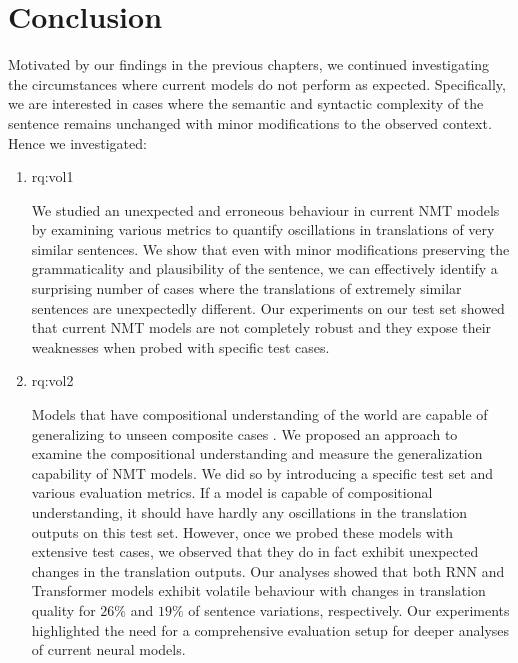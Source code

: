 \section{Conclusion} \label{secvolconc}

Motivated by our findings in the previous chapters, we continued investigating the circumstances where current models do not perform as expected. 
Specifically, we are interested in cases where the semantic and syntactic complexity of the sentence remains unchanged with minor modifications to the observed context. 
Hence we investigated:


 
\begin{enumerate}[label=\textbf{RQ3.\arabic* },wide = 0pt, leftmargin=2em]
\setlength\itemsep{1em}
 \setcounter{enumi}{2}
\item \acl{rq:vol1}

\medskip

\noindent We studied an unexpected and erroneous behaviour in current NMT models by examining various metrics to quantify oscillations in translations of very similar sentences.   
We show that even with minor modifications preserving the grammaticality and plausibility of the sentence, we can effectively identify a surprising number of cases where the translations of extremely similar sentences are unexpectedly different. 
Our experiments on our test set showed that current NMT models are not completely robust and they expose their weaknesses when probed with specific test cases.

\item \acl{rq:vol2}

\medskip

\noindent Models that have compositional understanding of the world are capable of generalizing to unseen composite cases \citep{886a37b5fc2f43449e4bca3b5557e3ae,cogswell2019emergence}.
We proposed an approach to examine the compositional understanding and measure the generalization capability of NMT models. 
We did so by introducing a specific test set and various evaluation metrics. 
If a model is capable of compositional understanding, it should have hardly any oscillations in the translation outputs on this test set. 
However, once we probed these models with extensive test cases, we observed that they do in fact exhibit unexpected changes in the translation outputs.
Our analyses showed that both RNN and Transformer models exhibit volatile behaviour with changes in translation quality for $26\%$ and $19\%$ of sentence variations, respectively.  
Our experiments highlighted the need for a comprehensive evaluation setup for deeper analyses of current neural models.

\end{enumerate}

